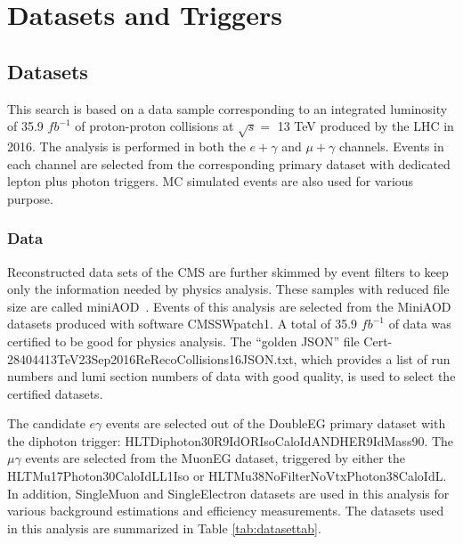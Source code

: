 \documentclass[thesis.tex]{subfiles}
\renewcommand\_{\textunderscore\allowbreak}
\begin{document}
\chapter{Datasets and Triggers}
\label{cap:datasets}

\section{Datasets}
\label{sec:dataandsimulation}
This search is based on a data sample corresponding to an integrated luminosity of 35.9 $fb^{-1}$ of proton-proton collisions at $\sqrt{s} =$ 13 TeV produced by the LHC in 2016.
The analysis is performed in both the $e + \gamma$ and $\mu + \gamma$ channels. 
Events in each channel  are selected from the corresponding primary dataset with dedicated lepton plus photon triggers.
MC simulated events are also used for various purpose.  

\subsection{Data}
Reconstructed data sets of the CMS are further skimmed by event filters to keep only the information needed by physics analysis. 
These samples with reduced file size are called miniAOD~\cite{miniAOD}. 
Events of this analysis are selected from the MiniAOD datasets produced with software CMSSW\_8\_0\_26\_patch1.
A total of 35.9 $fb^{-1}$ of data was certified to be good for physics analysis. The ``golden JSON'' file 
Cert\_271036-284044\_13TeV\_23Sep2016ReReco\_Collisions16\_JSON.txt, which provides a list of run numbers and lumi section numbers of data with good quality, is used to select the certified datasets. 

The candidate $e\gamma$ events are selected out of the DoubleEG primary dataset with the diphoton trigger: HLT\_Diphoton30\_18\_R9Id\_OR\_IsoCaloId\_AND\_HE\_R9Id\_Mass90. 
The $\mu\gamma$ events are selected from the MuonEG dataset, triggered by either the HLT\_Mu17\_Photon30\_CaloIdL\_L1Iso or HLT\_Mu38NoFilterNoVtx\_Photon38\_CaloIdL. 
In addition, SingleMuon and SingleElectron datasets are used in this analysis for various background estimations and efficiency measurements. 
The datasets used in this analysis are summarized in Table \ref{tab:datasettab}. \\
\end{document}
